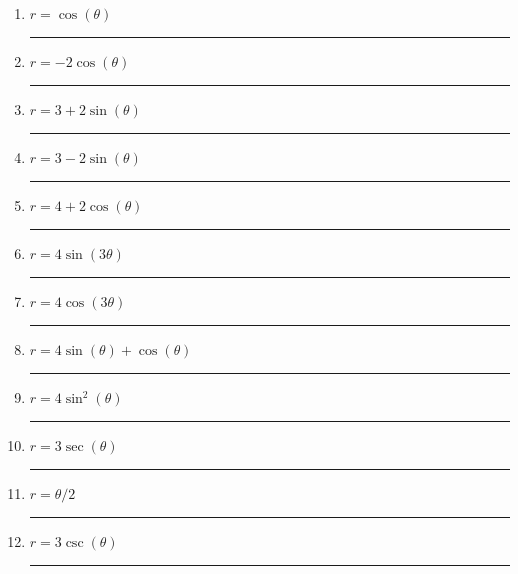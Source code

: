 \documentclass[11pt]{exam}
\begin{document}
\newcommand\aline[1]{\rule{0.5in}{0.2pt} }

\vspace{2ex}
\begin{multicols}{3}
	\begin{enumerate}
		\item $r = \cos(\theta)$ \aline{A}
		\item $r = -2 \cos(\theta)$ \aline{B}
		\item $r = 3+2\sin(\theta)$ \aline{C}
		\item $r = 3-2\sin(\theta)$ \aline{D}
		\item $r=4+2\cos(\theta)$ \aline{E}
		\item $r=4\sin(3\theta)$ \aline{F}
		\item $r=4\cos(3\theta)$ \aline{G}
		\item $r=4\sin(\theta)+\cos(\theta)$ \aline{H}
		\item $r=4\sin^2(\theta)$ \aline{I}
		\item $r = 3\sec(\theta)$ \aline{J}
		\item $r = \theta/2$ \aline{K}
		\item $r = 3\csc(\theta)$ \aline{L}
	\end{enumerate}
	\end{multicols}
\clearpage
\end{document}
